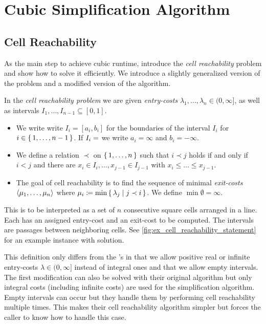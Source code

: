 \section{Cubic Simplification Algorithm}
\label{sec:cubic_algo}


\subsection{Cell Reachability}
\label{ssec:cell_reachability}
As the main step to achieve cubic runtime, \citeauthor{polyline_simplification_has_cubic_complexity_bringmannetal} introduce the \emph{cell reachability} problem and show how to solve it efficiently. We introduce a slightly generalized version of the problem and a modified version of the algorithm. 

\begin{definition}
	In the \emph{cell reachability problem} we are given \emph{entry-costs} \(\lambda_1, \dots, \lambda_n \in (0, \infty]\), as well as intervals \(I_1, \dots, I_{n-1} \subseteq [0, 1]\). 

	\begin{itemize}
		\item We write write \(I_i = [a_i, b_i]\) for the boundaries of the interval \(I_i\) for \(i \in \set{1, \dots, n - 1}\). If \(I_i = \empty\) we write \(a_i = \infty\) and \(b_i = -\infty\).
	  
		\item We define a relation \(\prec\) on \(\set{1, \dots, n}\) such that \(i \prec j\) holds if and only if \(i < j\) and there are \(x_i \in I_i, \dots, x_{j-1} \in I_{j-1}\) with \(x_i \leq \dots \leq x_{j - 1}\).

		\item The goal of cell reachability is to find the sequence of minimal \emph{exit-costs} \(\left\langle\mu_1, \dots, \mu_n\right\rangle\) where \(\mu_i \coloneq \min \set{ \lambda_j \mid j \prec i}\). We define \(\min \emptyset = \infty\).
	\end{itemize}
\end{definition}

This is to be interpreted as a set of \(n\) consecutive square cells arranged in a line. Each has an assigned entry-cost and an exit-cost to be computed. The intervals are passages between neighboring cells. See \cref{fig:ex_cell_reachability_statement} for an example instance with solution.

This definition only differs from the \citeauthor{polyline_simplification_has_cubic_complexity_bringmannetal}'s in that we allow positive real or infinite entry-costs \(\lambda \in (0, \infty]\) instead of integral ones and that we allow empty intervals. The first modification can also be solved with their original algorithm but only integral costs (including infinite costs) are used for the simplification algorithm. Empty intervals can occur but they handle them by performing cell reachability multiple times.  This makes their cell reachability algorithm simpler but forces the caller to know how to handle this case.

